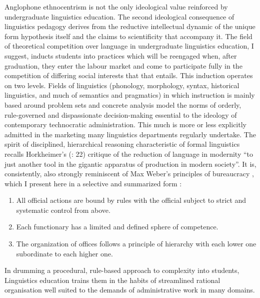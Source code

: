 \documentclass[output=paper]{langscibook}
\begin{document}
Anglophone ethnocentrism is not the only ideological value reinforced by undergraduate linguistics education. The second ideological consequence of linguistics pedagogy derives from the reductive intellectual dynamic of the unique form hypothesis itself and the claims to scientificity that accompany it. The field of theoretical competition over language in undergraduate linguistics education, I suggest, inducts students into practices which will be reengaged when, after graduation, they enter the labour market and come to participate fully in the competition of differing social interests that that entails. This induction operates on two levels. Fields of linguistics (phonology, morphology, syntax, historical linguistics, and much of semantics and pragmatics) in which instruction is mainly based around problem sets and concrete analysis model the norms of orderly, rule-governed and dispassionate decision-making essential to the ideology of contemporary technocratic administration. This much is more or less explicitly admitted in the marketing many linguistics departments regularly undertake. The spirit of disciplined, hierarchical reasoning characteristic of formal linguistics recalls Horkheimer's (\citeyear{Horkheimer19921947}: 22) critique of the reduction of language in modernity ``to just another tool in the gigantic apparatus of production in modern society''. It is, consistently, also strongly reminiscent of Max Weber's principles of bureaucracy \citep[329-341]{Weber1947}, which I present here in a selective and summarized form \citep[177-178]{Blackburn1967}:

\begin{enumerate}
    \item All official actions are bound by rules with the official subject to strict and systematic control from above.
    \item Each functionary has a limited and defined sphere of competence.
    \item The organization of offices follows a principle of hierarchy with each lower one subordinate to each higher one.
\end{enumerate}

In drumming a procedural, rule-based approach to complexity into students, Linguistics education trains them in the habits of streamlined rational organisation well suited to the demands of administrative work in many domains.
\end{document}
